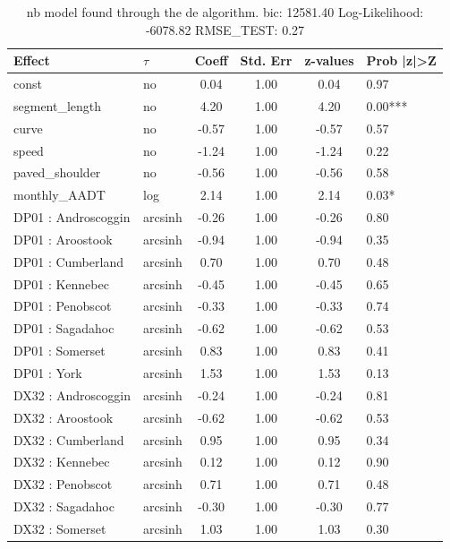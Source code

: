 \begin{table}
	\caption{nb model found through the de algorithm. bic: 12581.40 Log-Likelihood: -6078.82 RMSE_TEST: 0.27}
	\begin{center}
		\begin{tabular}{|l|l|c|c|c|l|}
			\hline
			Effect & $\tau$ & Coeff & Std. Err & z-values & Prob |z|>Z \\
			\hline
			const & no & 0.04 & 1.00 & 0.04 & 0.97 \\
			\hline
			segment_length & no & 4.20 & 1.00 & 4.20 & 0.00*** \\
			\hline
			curve & no & -0.57 & 1.00 & -0.57 & 0.57 \\
			\hline
			speed & no & -1.24 & 1.00 & -1.24 & 0.22 \\
			\hline
			paved_shoulder & no & -0.56 & 1.00 & -0.56 & 0.58 \\
			\hline
			monthly_AADT & log & 2.14 & 1.00 & 2.14 & 0.03* \\
			\hline
			DP01 : Androscoggin & arcsinh & -0.26 & 1.00 & -0.26 & 0.80 \\
			\hline
			DP01 : Aroostook & arcsinh & -0.94 & 1.00 & -0.94 & 0.35 \\
			\hline
			DP01 : Cumberland & arcsinh & 0.70 & 1.00 & 0.70 & 0.48 \\
			\hline
			DP01 : Kennebec & arcsinh & -0.45 & 1.00 & -0.45 & 0.65 \\
			\hline
			DP01 : Penobscot & arcsinh & -0.33 & 1.00 & -0.33 & 0.74 \\
			\hline
			DP01 : Sagadahoc & arcsinh & -0.62 & 1.00 & -0.62 & 0.53 \\
			\hline
			DP01 : Somerset & arcsinh & 0.83 & 1.00 & 0.83 & 0.41 \\
			\hline
			DP01 : York & arcsinh & 1.53 & 1.00 & 1.53 & 0.13 \\
			\hline
			DX32 : Androscoggin & arcsinh & -0.24 & 1.00 & -0.24 & 0.81 \\
			\hline
			DX32 : Aroostook & arcsinh & -0.62 & 1.00 & -0.62 & 0.53 \\
			\hline
			DX32 : Cumberland & arcsinh & 0.95 & 1.00 & 0.95 & 0.34 \\
			\hline
			DX32 : Kennebec & arcsinh & 0.12 & 1.00 & 0.12 & 0.90 \\
			\hline
			DX32 : Penobscot & arcsinh & 0.71 & 1.00 & 0.71 & 0.48 \\
			\hline
			DX32 : Sagadahoc & arcsinh & -0.30 & 1.00 & -0.30 & 0.77 \\
			\hline
			DX32 : Somerset & arcsinh & 1.03 & 1.00 & 1.03 & 0.30 \\

\end{tabular}
\end{center}
\end{table}

